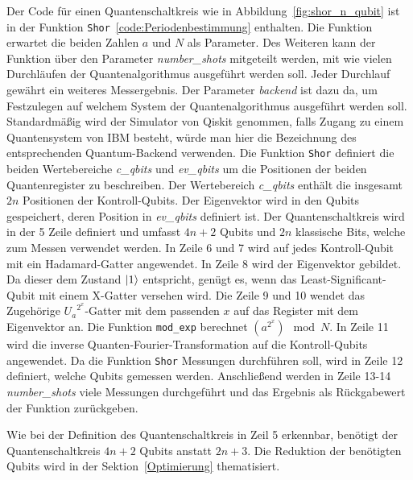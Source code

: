 \vspace{1em}

Der Code für einen Quantenschaltkreis wie in Abbildung~\ref{fig:shor_n_qubit} ist in der Funktion 
\texttt{Shor}~\ref{code:Periodenbestimmung} enthalten.
Die Funktion erwartet die beiden Zahlen \(a\) und \(N\) als Parameter.
Des Weiteren kann der Funktion über den Parameter \textit{number\_shots} mitgeteilt werden, 
mit wie vielen Durchläufen der Quantenalgorithmus ausgeführt werden soll.
Jeder Durchlauf gewährt ein weiteres Messergebnis.
Der Parameter \textit{backend} ist dazu da, 
um Festzulegen auf welchem System der Quantenalgorithmus ausgeführt werden soll.
Standardmäßig wird der Simulator von Qiskit genommen, 
falls Zugang zu einem Quantensystem von IBM besteht, 
würde man hier die Bezeichnung des entsprechenden Quantum-Backend verwenden.
Die Funktion \texttt{Shor} definiert die beiden Wertebereiche \textit{c\_qbits} und 
\textit{ev\_qbits} um die Positionen der beiden Quantenregister zu beschreiben.
Der Wertebereich \textit{c\_qbits} enthält die insgesamt \(2n\) Positionen der Kontroll-Qubits.
Der Eigenvektor wird in den Qubits gespeichert, 
deren Position in \textit{ev\_qbits} definiert ist.
Der Quantenschaltkreis wird in der 5 Zeile definiert und umfasst \(4n+2\) Qubits und 
\(2n\) klassische Bits, welche zum Messen verwendet werden.
In Zeile 6 und 7 wird auf jedes Kontroll-Qubit mit ein Hadamard-Gatter angewendet.
In Zeile 8 wird der Eigenvektor gebildet. 
Da dieser dem Zustand \(\ket{1}\) entspricht,
genügt es, wenn das Least-Significant-Qubit mit einem X-Gatter versehen wird.
Die Zeile 9 und 10 wendet das Zugehörige \({U_a}^{2^x}\)-Gatter mit dem passenden \(x\) auf das Register mit dem Eigenvektor an.
Die Funktion \texttt{mod\_exp} berechnet \((a^{2^x})\mod N\).
In Zeile 11 wird die inverse Quanten-Fourier-Transformation auf die Kontroll-Qubits angewendet.
Da die Funktion \texttt{Shor} Messungen durchführen soll, 
wird in Zeile 12 definiert, welche Qubits gemessen werden. 
Anschließend werden in Zeile 13-14 \textit{number\_shots} viele Messungen durchgeführt und 
das Ergebnis als Rückgabewert der Funktion zurückgeben.

Wie bei der Definition des Quantenschaltkreis in Zeil 5 erkennbar, 
benötigt der Quantenschaltkreis \(4n+2\) Qubits anstatt \(2n+3\).
Die Reduktion der benötigten Qubits wird in der Sektion~\ref{Optimierung} thematisiert. 


